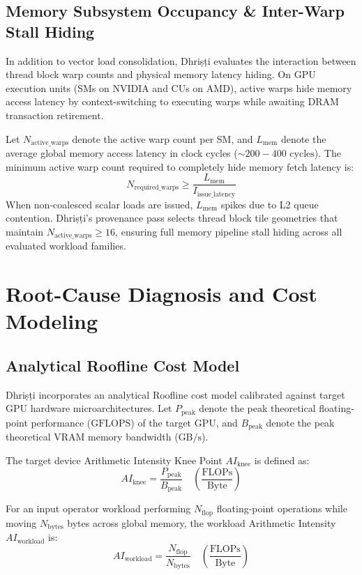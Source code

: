 \documentclass[10pt,journal,compsoc]{IEEEtran}
\begin{document}
\subsection{Memory Subsystem Occupancy \& Inter-Warp Stall Hiding}
In addition to vector load consolidation, Dhri\d{s}\d{t}i evaluates the interaction between thread block warp counts and physical memory latency hiding. On GPU execution units (SMs on NVIDIA and CUs on AMD), active warps hide memory access latency by context-switching to executing warps while awaiting DRAM transaction retirement.

Let $N_{\text{active\_warps}}$ denote the active warp count per SM, and $L_{\text{mem}}$ denote the average global memory access latency in clock cycles ($\sim 200 - 400\text{ cycles}$). The minimum active warp count required to completely hide memory fetch latency is:
\begin{equation}
N_{\text{required\_warps}} \ge \frac{L_{\text{mem}}}{I_{\text{issue\_latency}}}
\end{equation}
When non-coalesced scalar loads are issued, $L_{\text{mem}}$ spikes due to L2 queue contention. Dhri\d{s}\d{t}i's provenance pass selects thread block tile geometries that maintain $N_{\text{active\_warps}} \ge 16$, ensuring full memory pipeline stall hiding across all evaluated workload families.

\section{Root-Cause Diagnosis and Cost Modeling}\label{sec:diagnosis}

\subsection{Analytical Roofline Cost Model}
Dhri\d{s}\d{t}i incorporates an analytical Roofline cost model calibrated against target GPU hardware microarchitectures. Let $P_{\text{peak}}$ denote the peak theoretical floating-point performance ($\text{GFLOPS}$) of the target GPU, and $B_{\text{peak}}$ denote the peak theoretical VRAM memory bandwidth ($\text{GB/s}$).

The target device Arithmetic Intensity Knee Point $AI_{\text{knee}}$ is defined as:
\begin{equation}
AI_{\text{knee}} = \frac{P_{\text{peak}}}{B_{\text{peak}}} \quad \left( \frac{\text{FLOPs}}{\text{Byte}} \right)
\end{equation}

For an input operator workload performing $N_{\text{flop}}$ floating-point operations while moving $N_{\text{bytes}}$ bytes across global memory, the workload Arithmetic Intensity $AI_{\text{workload}}$ is:
\begin{equation}
AI_{\text{workload}} = \frac{N_{\text{flop}}}{N_{\text{bytes}}} \quad \left( \frac{\text{FLOPs}}{\text{Byte}} \right)
\end{equation}
\end{document}

